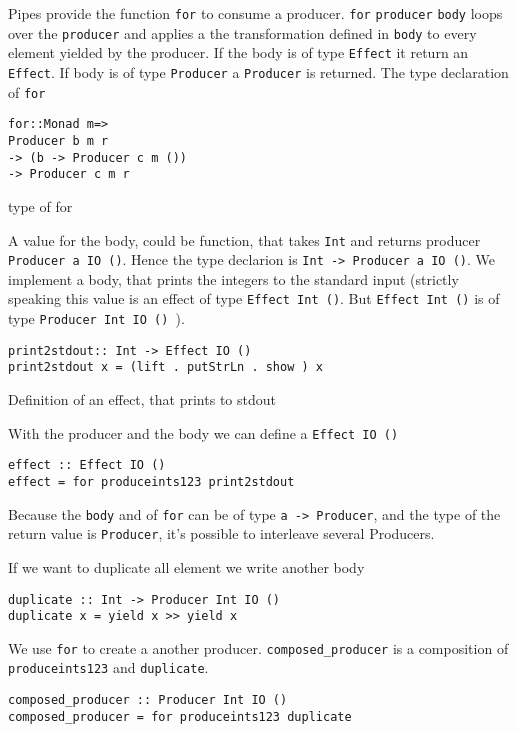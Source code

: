 \documentclass[twoside, a4paper]{article}
\begin{document}
Pipes provide the function \verb|for| to consume a producer. 
\verb|for| \verb|producer| \verb|body| loops over the \verb|producer| and applies a the transformation defined in \verb|body| to every element yielded by the producer. If the body is of type \verb|Effect| it return an \verb|Effect|. If body is of type \verb|Producer| a \verb|Producer| is returned. The type declaration of \verb|for| 
\begin{program}
\begin{verbatim}
for::Monad m=>
Producer b m r
-> (b -> Producer c m ())
-> Producer c m r
\end{verbatim}
\caption{type of for}
\end{program}

A value for the body, could be function, that takes \verb|Int| and returns producer \verb|Producer a IO ()|. Hence the type declarion is \verb|Int -> Producer a IO ()|. We implement a body, that prints the integers to the standard input (strictly speaking this value is an effect of type \verb|Effect Int ()|. But \verb|Effect Int ()| is of type \verb|Producer Int IO () |).

\begin{program}
\begin{verbatim}
print2stdout:: Int -> Effect IO ()
print2stdout x = (lift . putStrLn . show ) x
\end{verbatim}
\caption{Definition of an effect, that prints to stdout}
\label{lst:stdouteffect}
\end{program}

With the producer and the body we can define a \verb|Effect IO ()|
\begin{verbatim}
effect :: Effect IO ()
effect = for produceints123 print2stdout
\end{verbatim}

Because the \verb|body| and of \verb|for| can be of type \verb|a -> Producer|, and the type of the return value is \verb|Producer|, it's possible to interleave several Producers.

If we want to duplicate all element we write another body
\begin{verbatim}
duplicate :: Int -> Producer Int IO ()
duplicate x = yield x >> yield x 
\end{verbatim}

We use \verb|for| to create a another producer. \verb|composed_producer| is a composition of \verb|produceints123| and \verb|duplicate|.
\begin{verbatim}
composed_producer :: Producer Int IO ()
composed_producer = for produceints123 duplicate
\end{verbatim}
\end{document}
